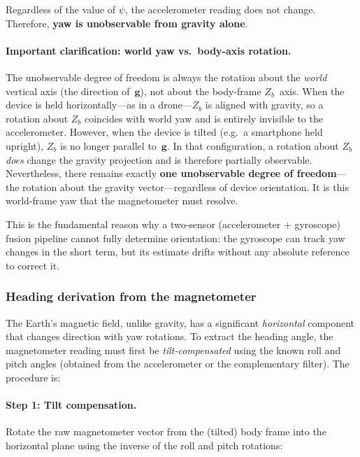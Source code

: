 \noindent Regardless of the value of $\psi$, the accelerometer reading does
not change. Therefore, \textbf{yaw is unobservable from gravity alone}.

\paragraph{Important clarification: world yaw vs.\ body-axis rotation.}
The unobservable degree of freedom is always the rotation about the
\emph{world} vertical axis (the direction of~$\mathbf{g}$), not about the
body-frame $Z_b$~axis. When the device is held horizontally---as in a
drone---$Z_b$ is aligned with gravity, so a rotation about $Z_b$ coincides
with world yaw and is entirely invisible to the accelerometer. However, when
the device is tilted (e.g.\ a smartphone held upright), $Z_b$ is no longer
parallel to~$\mathbf{g}$. In that configuration, a rotation about $Z_b$
\emph{does} change the gravity projection and is therefore partially
observable. Nevertheless, there remains exactly \textbf{one unobservable
degree of freedom}---the rotation about the gravity vector---regardless of
device orientation. It is this world-frame yaw that the magnetometer must
resolve.

This is the fundamental reason why a two-sensor (accelerometer + gyroscope)
fusion pipeline cannot fully determine orientation: the gyroscope can track
yaw changes in the short term, but its estimate drifts without any absolute
reference to correct it.

\subsubsection{Heading derivation from the magnetometer}
\label{sec:frames:mag:heading}

The Earth's magnetic field, unlike gravity, has a significant \emph{horizontal}
component that changes direction with yaw rotations. To extract the heading
angle, the magnetometer reading must first be \emph{tilt-compensated} using
the known roll and pitch angles (obtained from the accelerometer or the
complementary filter). The procedure is:

\paragraph{Step 1: Tilt compensation.}
Rotate the raw magnetometer vector from the (tilted) body frame into the
horizontal plane using the inverse of the roll and pitch rotations:

